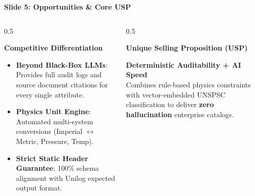\documentclass[aspectratio=169, 10pt]{beamer}
\begin{document}
\begin{frame}{\textbf{Slide 5: Opportunities \& Core USP}}
  \begin{columns}
    \begin{column}{0.5\textwidth}
      \begin{block}{\textbf{Competitive Differentiation}}
        \begin{itemize}
          \item \textbf{Beyond Black-Box LLMs}: Provides full audit logs and source document citations for every single attribute.
          \item \textbf{Physics Unit Engine}: Automated multi-system conversions (Imperial $\leftrightarrow$ Metric, Pressure, Temp).
          \item \textbf{Strict Static Header Guarantee}: 100\% schema alignment with Unilog expected output format.
        \end{itemize}
      \end{block}
    \end{column}

    \begin{column}{0.5\textwidth}
      \begin{block}{\textbf{Unique Selling Proposition (USP)}}
        \begin{center}
          \Large \textbf{Deterministic Auditability + AI Speed} \\
          \vspace{0.2cm}
          \small Combines rule-based physics constraints with vector-embedded UNSPSC classification to deliver \textbf{zero hallucination} enterprise catalogs.
        \end{center}
      \end{block}
    \end{column}
  \end{columns}
\end{frame}
\end{document}
